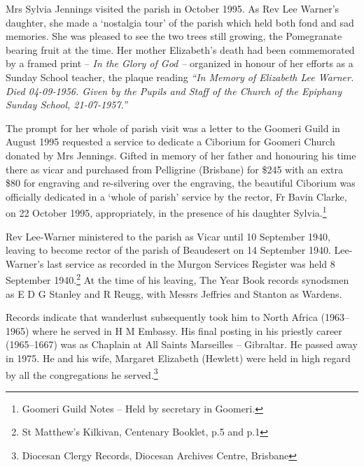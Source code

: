 Mrs Sylvia Jennings visited the parish in October 1995. As Rev Lee Warner's daughter, she made a `nostalgia tour' of the parish which held both fond and sad memories. She was pleased to see the two trees still growing, the Pomegranate bearing fruit at the time. Her mother Elizabeth's death had been commemorated by a framed print -- \emph{In the Glory of God --} organized in honour of her efforts as a Sunday School teacher, the plaque reading \emph{``In Memory of Elizabeth Lee Warner. Died 04-09-1956. Given by the Pupils and Staff of the Church of the Epiphany Sunday School, 21-07-1957.''}



The prompt for her whole of parish visit was a letter to the Goomeri Guild in August 1995 requested a service to dedicate a Ciborium for Goomeri Church donated by Mrs Jennings. Gifted in memory of her father and honouring his time there as vicar and purchased from Pelligrine (Brisbane) for \$245 with an extra \$80 for engraving and re-silvering over the engraving, the beautiful Ciborium was officially dedicated in a `whole of parish' service by the rector, Fr Bavin Clarke, on 22 October 1995, appropriately, in the presence of his daughter Sylvia.\footnote{Goomeri Guild Notes -- Held by secretary in Goomeri.}


Rev Lee-Warner ministered to the parish as Vicar until 10 September 1940, leaving to become rector of the parish of Beaudesert on 14 September 1940. Lee-Warner's last service as recorded in the Murgon Services Register was held 8 September 1940.\footnote{St Matthew's Kilkivan, Centenary Booklet, p.5 and p.1} At the time of his leaving, The Year Book records synodsmen as E D G Stanley and R Reugg, with Messrs Jeffries and Stanton as Wardens.


Records indicate that wanderlust subsequently took him to North Africa (1963--1965) where he served in H M Embassy. His final posting in his priestly career (1965--1667) was as Chaplain at All Saints Marseilles -- Gibraltar. He passed away in 1975. He and his wife, Margaret Elizabeth (Hewlett) were held in high regard by all the congregations he served.\footnote{Diocesan Clergy Records, Diocesan Archives Centre, Brisbane}


\balance


